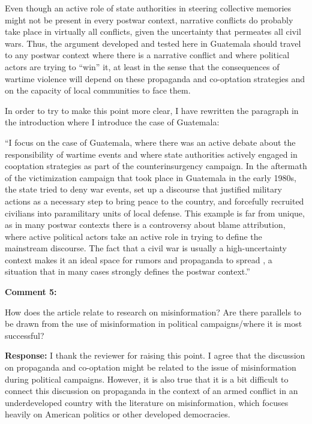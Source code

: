 \documentclass[12pt, a4paper, notitlepage]{article}
\begin{document}
Even though an active role of state authorities in steering collective memories might not be present in every postwar context, narrative conflicts do probably take place in virtually all conflicts, given the uncertainty that permeates all civil wars.
Thus, the argument developed and tested here in Guatemala should travel to any postwar context where there is a narrative conflict and where political actors are trying to ``win'' it, at least in the sense that the consequences of wartime violence will depend on these propaganda and co-optation strategies and on the capacity of local communities to face them.

In order to try to make this point more clear, I have rewritten the paragraph in the introduction where I introduce the case of Guatemala:

``I focus on the case of Guatemala, where there was an active debate about the responsibility of wartime events and where state authorities actively engaged in cooptation strategies as part of the counterinsurgency campaign.
In the aftermath of the victimization campaign that took place in Guatemala in the early 1980s, the state tried to deny war events, set up a discourse that justified military actions as a necessary step to bring peace to the country, and forcefully recruited civilians into paramilitary units of local defense.
This example is far from unique, as in many postwar contexts there is a controversy about blame attribution, where active political actors take an active role in trying to define the mainstream discourse.
The fact that a civil war is usually a high-uncertainty context makes it an ideal space for rumors and propaganda to spread \citep{Schon:2021wf}, a situation that in many cases strongly defines the postwar context.''

\vspace{15pt}
\noindent\textbf{Comment 5:}
\begin{displayquote}
How does the article relate to research on misinformation? Are there parallels to be drawn from the use of misinformation in political campaigns/where it is most successful?
\end{displayquote}

\noindent\textbf{Response:} I thank the reviewer for raising this point. I agree that the discussion on propaganda and co-optation might be related to the issue of misinformation during political campaigns. However, it is also true that it is a bit difficult to connect this discussion on propaganda in the context of an armed conflict in an underdeveloped country with the literature on misinformation, which focuses heavily on American politics or other developed democracies.
\end{document}
